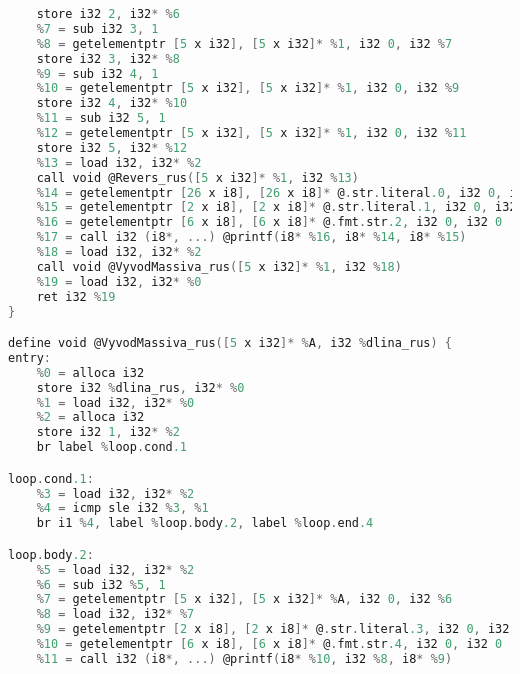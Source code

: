 \newpage
\setcounter{lstlisting}{4}
\begin{lstlisting}[language=go, firstnumber=last, caption={Пример промежуточного представления LLVM IR для разворота массива}]
	%6 = getelementptr [5 x i32], [5 x i32]* %1, i32 0, i32 %5
	store i32 2, i32* %6
	%7 = sub i32 3, 1
	%8 = getelementptr [5 x i32], [5 x i32]* %1, i32 0, i32 %7
	store i32 3, i32* %8
	%9 = sub i32 4, 1
	%10 = getelementptr [5 x i32], [5 x i32]* %1, i32 0, i32 %9
	store i32 4, i32* %10
	%11 = sub i32 5, 1
	%12 = getelementptr [5 x i32], [5 x i32]* %1, i32 0, i32 %11
	store i32 5, i32* %12
	%13 = load i32, i32* %2
	call void @Revers_rus([5 x i32]* %1, i32 %13)
	%14 = getelementptr [26 x i8], [26 x i8]* @.str.literal.0, i32 0, i32 0
	%15 = getelementptr [2 x i8], [2 x i8]* @.str.literal.1, i32 0, i32 0
	%16 = getelementptr [6 x i8], [6 x i8]* @.fmt.str.2, i32 0, i32 0
	%17 = call i32 (i8*, ...) @printf(i8* %16, i8* %14, i8* %15)
	%18 = load i32, i32* %2
	call void @VyvodMassiva_rus([5 x i32]* %1, i32 %18)
	%19 = load i32, i32* %0
	ret i32 %19
}

define void @VyvodMassiva_rus([5 x i32]* %A, i32 %dlina_rus) {
entry:
	%0 = alloca i32
	store i32 %dlina_rus, i32* %0
	%1 = load i32, i32* %0
	%2 = alloca i32
	store i32 1, i32* %2
	br label %loop.cond.1

loop.cond.1:
	%3 = load i32, i32* %2
	%4 = icmp sle i32 %3, %1
	br i1 %4, label %loop.body.2, label %loop.end.4

loop.body.2:
	%5 = load i32, i32* %2
	%6 = sub i32 %5, 1
	%7 = getelementptr [5 x i32], [5 x i32]* %A, i32 0, i32 %6
	%8 = load i32, i32* %7
	%9 = getelementptr [2 x i8], [2 x i8]* @.str.literal.3, i32 0, i32 0
	%10 = getelementptr [6 x i8], [6 x i8]* @.fmt.str.4, i32 0, i32 0
	%11 = call i32 (i8*, ...) @printf(i8* %10, i32 %8, i8* %9)
\end{lstlisting}

